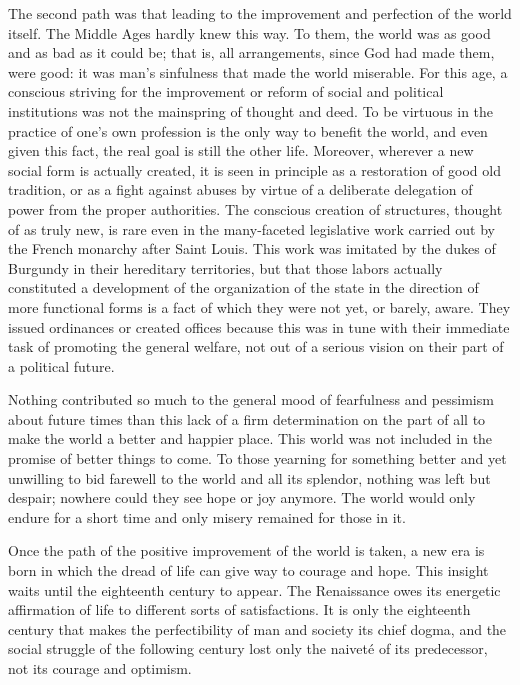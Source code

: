 The second path was that leading to the improvement and perfection of
the world itself. The Middle Ages hardly knew this way.
\protect\hypertarget{09_Chapter_Two__THE_CRAVING_FOR_A_M.xhtmlux5cux23page_37}{}{}To
them, the world was as good and as bad as it could be; that is, all
arrangements, since God had made them, were good: it was man's
sinfulness that made the world miserable. For this age, a conscious
striving for the improvement or reform of social and political
institutions was not the mainspring of thought and deed. To be virtuous
in the practice of one's own profession is the only way to benefit the
world, and even given this fact, the real goal is still the other life.
Moreover, wherever a new social form is actually created, it is seen in
principle as a restoration of good old tradition, or as a fight against
abuses by virtue of a deliberate delegation of power from the proper
authorities. The conscious creation of structures, thought of as truly
new, is rare even in the many-faceted legislative work carried out by
the French monarchy after Saint Louis. This work was imitated by the
dukes of Burgundy in their hereditary territories, but that those labors
actually constituted a development of the organization of the state in
the direction of more functional forms is a fact of which they were not
yet, or barely, aware. They issued ordinances or created offices because
this was in tune with their immediate task of promoting the general
welfare, not out of a serious vision on their part of a political
future.

Nothing contributed so much to the general mood of fearfulness and
pessimism about future times than this lack of a firm determination on
the part of all to make the world a better and happier place. This world
was not included in the promise of better things to come. To those
yearning for something better and yet unwilling to bid farewell to the
world and all its splendor, nothing was left but despair; nowhere could
they see hope or joy anymore. The world would only endure for a short
time and only misery remained for those in it.

Once the path of the positive improvement of the world is taken, a new
era is born in which the dread of life can give way to courage and hope.
This insight waits until the eighteenth century to appear. The
Renaissance owes its energetic affirmation of life to different sorts of
satisfactions. It is only the eighteenth century that makes the
perfectibility of man and society its chief dogma, and the social
struggle of the following century lost only the naiveté of its
predecessor, not its courage and optimism.

